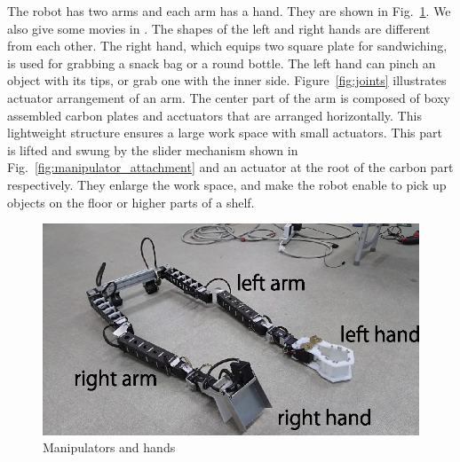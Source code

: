 \documentclass{llncs}
\begin{document}
The robot has two arms and each arm has a hand.
They are shown in Fig.~\ref{fig:manipulators}.
We also give some movies in \cite{citba2016}.
The shapes of the left and right hands are different from each other.
The right hand, which equips two square plate for sandwiching,
is used for grabbing a snack bag or a round bottle.
The left hand can pinch an object with its tips,
or grab one with the inner side.
Figure~\ref{fig:joints} illustrates actuator arrangement of an arm.
The center part of the arm is composed of boxy assembled carbon plates
and acctuators that are arranged horizontally.
This lightweight structure ensures a large work space with small actuators.
This part is lifted and swung by the slider mechanism shown in
Fig.~\ref{fig:manipulator_attachment} and an actuator at the
root of the carbon part respectively.
They enlarge the work space, and make the robot enable to pick up
objects on the floor or higher parts of a shelf.


\begin{figure}[h]
	\begin{center}
		\includegraphics[width=0.7\linewidth]{./IMAGE/manipulators.eps}
		\caption{Manipulators and hands}
		\label{fig:manipulators}
	\end{center}
\end{figure}
\end{document}
